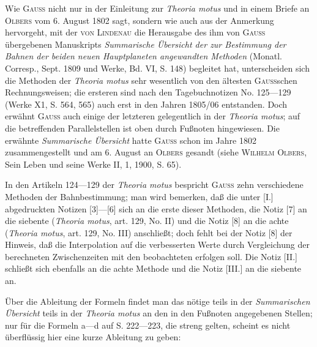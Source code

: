 Wie \textsc{Gauss} nicht nur in der Einleitung zur \textit{Theoria motus} und in einem Briefe an \textsc{Olbers} vom 6. August 1802 sagt, sondern wie auch aus der Anmerkung hervorgeht, mit der \textsc{von Lindenau} die Herausgabe des ihm von \textsc{Gauss} übergebenen Manuskripts \textit{Summarische Übersicht der zur Bestimmung der Bahnen der beiden neuen Hauptplaneten angewandten Methoden} (Monatl. Corresp., Sept. 1809 und Werke, Bd. VI, S. 148) begleitet hat, unterscheiden sich die Methoden der \textit{Theoria motus} sehr wesentlich von den ältesten \textsc{Gauss}schen Rechnungsweisen; die ersteren sind nach den Tagebuchnotizen No. 125—129 (Werke X1, S. 564, 565) auch erst in den Jahren 1805/06 entstanden. Doch erwähnt \textsc{Gauss} auch einige der letzteren gelegentlich in der \textit{Theoria motus}; auf die betreffenden Parallelstellen ist oben durch Fußnoten hingewiesen. Die erwähnte \textit{Summarische Übersicht} hatte \textsc{Gauss} schon im Jahre 1802 zusammengestellt und am 6. August an \textsc{Olbers} gesandt (siehe \textsc{Wilhelm Olbers}, Sein Leben und seine Werke II, 1, 1900, S. 65).

In den Artikeln 124—129 der \textit{Theoria motus} bespricht \textsc{Gauss} zehn verschiedene Methoden der Bahnbestimmung; man wird bemerken, daß die unter [I.] abgedruckten Notizen [3]—[6] sich an die erste dieser Methoden, die Notiz [7] an die siebente (\textit{Theoria motus}, art. 129, No. II) und die Notiz [8] an die achte (\textit{Theoria motus}, art. 129, No. III) anschließt; doch fehlt bei der Notiz [8] der Hinweis, daß die Interpolation auf die verbesserten Werte durch Vergleichung der berechneten Zwischenzeiten mit den beobachteten erfolgen soll. Die Notiz [II.] schließt sich ebenfalls an die achte Methode und die Notiz [III.] an die siebente an.

Über die Ableitung der Formeln findet man das nötige teils in der \textit{Summarischen Übersicht} teils in der \textit{Theoria motus} an den in den Fußnoten angegebenen Stellen; nur für die Formeln a—d auf S. 222—223, die streng gelten, scheint es nicht überflüssig hier eine kurze Ableitung zu geben:

